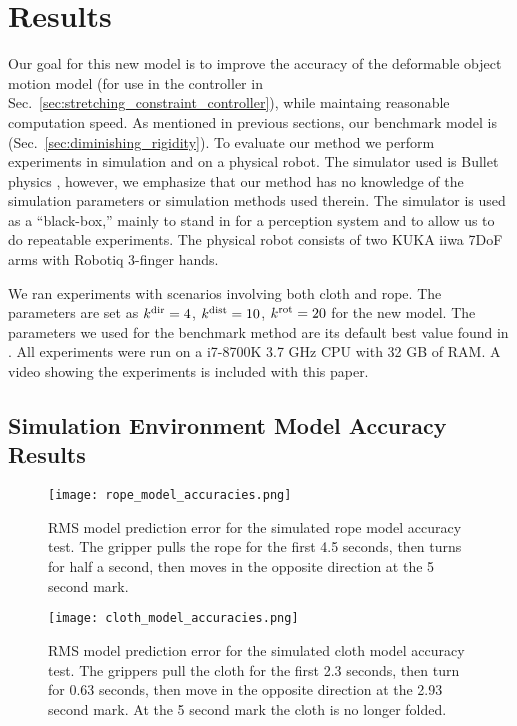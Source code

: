 \section{Results}
\label{sec:modelling_results}

Our goal for this new model is to improve the accuracy of the deformable object motion model (for use in the controller in Sec.~\ref{sec:stretching_constraint_controller}), while maintaing reasonable computation speed. As mentioned in previous sections, our benchmark model is \cite{Berenson2013} (Sec.~\ref{sec:diminishing_rigidity}). To evaluate our method we perform experiments in simulation and on a physical robot. The simulator used is Bullet physics \cite{Coumans2010}, however, we emphasize that our method has no knowledge of the simulation parameters or simulation methods used therein. The simulator is used as a ``black-box,'' mainly to stand in for a perception system and to allow us to do repeatable experiments. The physical robot consists of two KUKA iiwa 7DoF arms with Robotiq 3-finger hands.

We ran experiments with scenarios involving both cloth and rope. The parameters are set as $k^\textrm{dir} = 4$, $k^\textrm{dist} = 10$, $k^{\textrm{rot}} = 20$ for the new model. The parameters we used for the benchmark method are its default best value found in \cite{McConachie2018}. All experiments were run on a i7-8700K 3.7 GHz CPU with 32 GB of RAM. A video showing the experiments is included with this paper.

\subsection{Simulation Environment Model Accuracy Results}

\begin{figure}[ht]
    \centering
    \texttt{[image: rope\_model\_accuracies.png]}
    \caption{RMS model prediction error for the simulated rope model accuracy test. The gripper pulls the rope for the first 4.5 seconds, then turns for half a second, then moves in the opposite direction at the 5 second mark.}
    \label{fig:rope_model_accuracy_plot}
\end{figure}

\begin{figure}[ht]
    \centering
    \texttt{[image: cloth\_model\_accuracies.png]}
    \caption{RMS model prediction error for the simulated cloth model accuracy test. The grippers pull the cloth for the first 2.3 seconds, then turn for 0.63 seconds, then move in the opposite direction at the 2.93 second mark. At the 5 second mark the cloth is no longer folded. }
    \label{fig:cloth_model_accuracy_plot}
\end{figure}

